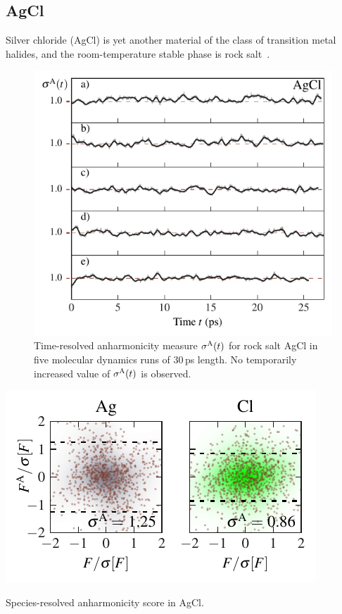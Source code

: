 \subsection{AgCl}
Silver chloride (AgCl) is yet another material of the class of transition metal halides, and the room-temperature stable phase is rock salt~\cite{Lowndes.1972,Andreoni.1983,Batchelor.1995}.
\begin{figure}
	\includegraphics[width=\textwidth]{./data/plots/defects/225.02.AgCl/sigma_vs_time.pdf}
	\caption{Time-resolved anharmonicity measure $\sigma^\mathrm{A} (t)$ for rock salt AgCl in five molecular dynamics runs of 30\,ps length. No temporarily increased value of $\sigma^\mathrm{A} (t)$ is observed.}
	\label{fig:defects.AgCl}
\end{figure}
%
\begin{marginfigure}[-2in]
	\includegraphics[width=\textwidth]{./data/plots/defects/225.02.AgCl/per_atom/histogram_atoms_margin.pdf}
	\caption{Species-resolved anharmonicity score in AgCl.}
	\label{fig:defects.AgCl.sigmaA}
\end{marginfigure}
